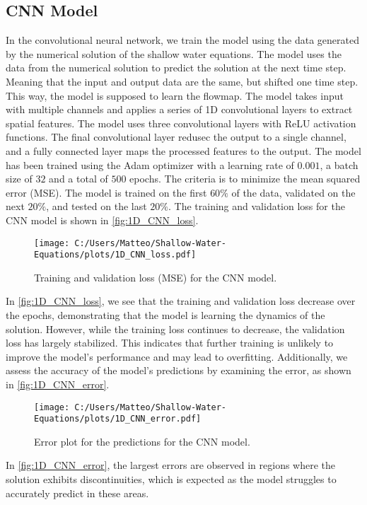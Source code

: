 \subsection*{CNN Model}
In the convolutional neural network, we train the model using the data generated by the numerical solution of the shallow water equations.
The model uses the data from the numerical solution to predict the solution at the next time step.
Meaning that the input and output data are the same, but shifted one time step. This way, the model is supposed to learn the flowmap.
The model takes input with multiple channels and applies a series of 1D convolutional layers to extract spatial features.
The model uses three convolutional layers with ReLU activation functions.
The final convolutional layer redusec the output to a single channel, and a fully connected layer maps the processed features to the output.
The model has been trained using the Adam optimizer with a learning rate of $0.001$, a batch size of $32$ and a total of $500$ epochs.
The criteria is to minimize the mean squared error (MSE).
The model is trained on the first $60\%$ of the data, validated on the next $20\%$, and tested on the last $20\%$.
The training and validation loss for the CNN model is shown in \autoref{fig:1D_CNN_loss}.
\begin{figure}[H]
    \centering
    \texttt{[image: C:/Users/Matteo/Shallow-Water-Equations/plots/1D\_CNN\_loss.pdf]}
    \caption{Training and validation loss (MSE) for the CNN model.}\label{fig:1D_CNN_loss}
\end{figure}
In \autoref{fig:1D_CNN_loss}, we see that the training and validation loss decrease over the epochs, demonstrating that the model is learning the dynamics of the solution.
However, while the training loss continues to decrease, the validation loss has largely stabilized.
This indicates that further training is unlikely to improve the model's performance and may lead to overfitting.
Additionally, we assess the accuracy of the model's predictions by examining the error, as shown in \autoref{fig:1D_CNN_error}.
\begin{figure}[H]
    \centering
    \texttt{[image: C:/Users/Matteo/Shallow-Water-Equations/plots/1D\_CNN\_error.pdf]}
    \caption{Error plot for the predictions for the CNN model.}\label{fig:1D_CNN_error}
\end{figure}
In \autoref{fig:1D_CNN_error}, the largest errors are observed in regions where the solution exhibits discontinuities, which is expected as the model struggles to accurately predict in these areas.
